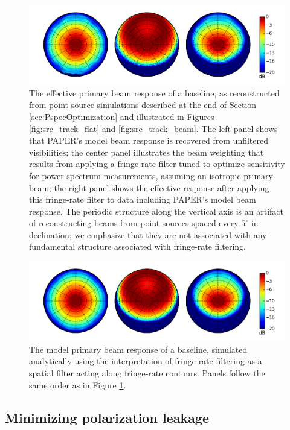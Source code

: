 \documentclass[twocolumn,apj,numberedappendix]{emulateapj}
\begin{document}
\begin{figure}\centering
\includegraphics[width=1.9\columnwidth]{plots/eff_beam.png}
\caption{
The effective primary beam response of a baseline, as reconstructed from point-source simulations 
described at the end of Section \ref{sec:PspecOptimization} and illustrated in Figures \ref{fig:src_track_flat} and
\ref{fig:src_track_beam}. 
The left panel shows that PAPER's model beam response is recovered from unfiltered
visibilities; the center panel illustrates the
beam weighting that results from applying a fringe-rate filter tuned to optimize sensitivity
for power spectrum measurements, assuming an isotropic primary beam; the right panel
shows the effective response after applying this fringe-rate filter to data including PAPER's model beam response.
The periodic structure along the vertical axis is an artifact of reconstructing beams from point sources 
spaced every $5^\circ$ in declination; we emphasize that they are not associated with any fundamental
structure associated with fringe-rate filtering.
}\label{fig:eff_beam}
\end{figure}

\begin{figure}\centering
\includegraphics[width=1.9\columnwidth]{plots/sim_beam.png}
\caption{
The model primary beam response of a baseline, simulated analytically using the interpretation
of fringe-rate filtering as a spatial filter acting along fringe-rate contours.  Panels follow
the same order as in Figure \ref{fig:eff_beam}.
}\label{fig:sim_beam}
\end{figure}

\subsection{Minimizing polarization leakage}
\label{sec:polbeams}
\def\VXX{{V_{\rm XX}}}
\def\VYY{{V_{\rm YY}}}
\def\VI{{V_{\rm I}}}
\def\VQ{{V_{\rm Q}}}
\end{document}

